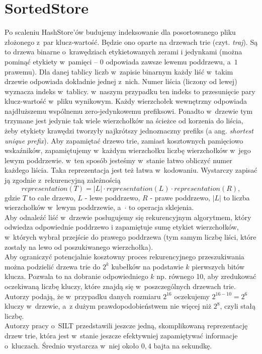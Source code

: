 \documentclass[declaration,shortabstract,masc]{iithesis}
\begin{document}
		\section{SortedStore}
			Po scaleniu HashStore'ów budujemy indeksowanie dla posortowanego pliku złożonego z~par klucz-wartość. Będzie ono oparte na drzewach trie (czyt. \textit{traj}). Są to drzewa binarne o~krawędziach etykietowanych zerami i jedynkami (można pominąć etykiety w~pamięci -- $0$ odpowiada zawsze lewemu poddrzewu, a~$1$ prawemu). Dla danej tablicy liczb w~zapisie binarnym każdy liść w~takim drzewie odpowiada dokładnie jednej z~nich. Numer liścia (liczony od lewej) wyznacza indeks w~tablicy. w~naszym przypadku ten indeks to przesunięcie pary klucz-wartość w~pliku wynikowym. Każdy wierzchołek wewnętrzny odpowiada najdłuższemu wspólnemu zero-jedynkowemu prefiksowi. Ponadto w~drzewie tym trzymane jest jedynie tak wiele wierzchołków na ścieżce od korzenia do liścia, żeby etykiety krawędzi tworzyły najkrótszy jednoznaczny prefiks (a ang. \textit{shortest unique prefix}). Aby zapamiętać drzewo trie, zamiast kosztownych pamięciowo wskaźników, zapamiętujemy w~każdym wierzchołku liczbę wierzchołków w~jego lewym poddrzewie. w~ten sposób jesteśmy w~stanie łatwo obliczyć numer każdego liścia. Taka reprezentacja jest też łatwa w~kodowaniu. Wystarczy zapisać ją zgodnie z~rekurencyjną zależnością
			$$representation\left(T\right) = |L| \cdot representation\left(L\right) \cdot representation\left(R\right),$$
			gdzie $T$ to całe drzewo, $L$ - lewe poddrzewo, $R$ - prawe poddrzewo, $|L|$ to liczba wierzchołków w~lewym poddrzewie, a~$\cdot$ to operacja sklejenia.\\
			\indent Aby odnaleźć liść w~drzewie posługujemy się rekurencyjnym algorytmem, który odwiedza odpowiednie poddrzewo i zapamiętuje sumę etykiet wierzchołków, w~których wybrał przejście do prawego poddrzewa (tym samym liczbę liści, które zostały na lewo od poszukiwanego wierzchołka).\\
			\indent Aby ograniczyć potencjalnie kosztowny proces rekurencyjnego przeszukiwania można podzielić drzewa trie do $2^k$ kubełków na podstawie $k$ pierwszych bitów klucza. Pozwala to na dobranie odpowiedniego $k$ np. równego 10, aby zredukować oczekiwaną liczbę kluczy, które znajdą się w~poszczególnych drzewach trie. Autorzy podają, że w~przypadku danych rozmiaru $2^{16}$ oczekujemy $2^{16-10} = 2^6$ kluczy w~drzewie, a~z dużym prawdopodobieństwem nie więcej niż $2^8$, czyli stałą liczbę.\\
			\indent Autorzy pracy o~SILT przedstawili jeszcze jedną, skomplikowaną reprezentację drzew trie, która jest w~stanie jeszcze efektywniej zapamiętywać informacje o~kluczach. Średnio wystarcza w~niej około $0,4$ bajta na sekundkę.
\end{document}
